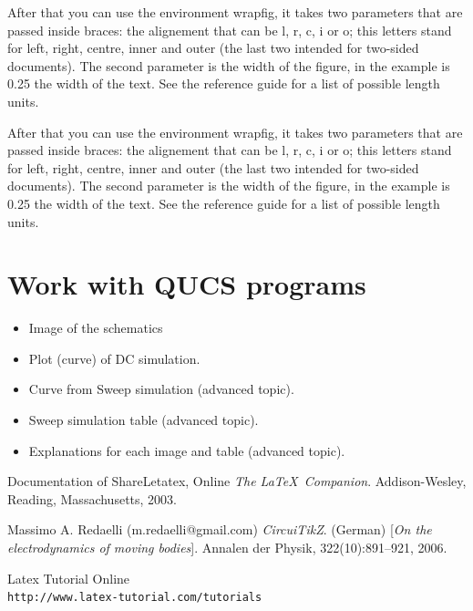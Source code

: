 \documentclass{report}
\begin{document}
  After that you can use the environment wrapfig, it takes two parameters that are passed inside braces: the alignement that can be l, r, c, i or o; this letters stand for left, right, centre, inner and outer (the last two intended for two-sided documents). The second parameter is the width of the figure, in the example is 0.25 the width of the text. See the reference guide for a list of possible length units.\cite{sharelatex,thirdRef}
  
   After that you can use the environment wrapfig, it takes two parameters that are passed inside braces: the alignement that can be l, r, c, i or o; this letters stand for left, right, centre, inner and outer (the last two intended for two-sided documents). The second parameter is the width of the figure, in the example is 0.25 the width of the text. See the reference guide for a list of possible length units.\cite{sharelatex,thirdRef}
 
 
 \section{Work with QUCS programs}


\begin{itemize}
\item Image of the schematics
\item Plot (curve) of DC simulation.
\item Curve from Sweep simulation (advanced topic).
\item Sweep simulation table (advanced topic).
\item Explanations for each image and table (advanced topic).
\end{itemize}




\begin{thebibliography}{9}
Documentation of ShareLetatex, Online
\textit{The \LaTeX\ Companion}. 
Addison-Wesley, Reading, Massachusetts, 2003.
 
Massimo A. Redaelli (m.redaelli@gmail.com)
\textit{CircuiTikZ}. (German) 
[\textit{On the electrodynamics of moving bodies}]. 
Annalen der Physik, 322(10):891–921, 2006.
 
Latex Tutorial Online
\\\texttt{http://www.latex-tutorial.com/tutorials}
\end{thebibliography}
\end{document}
